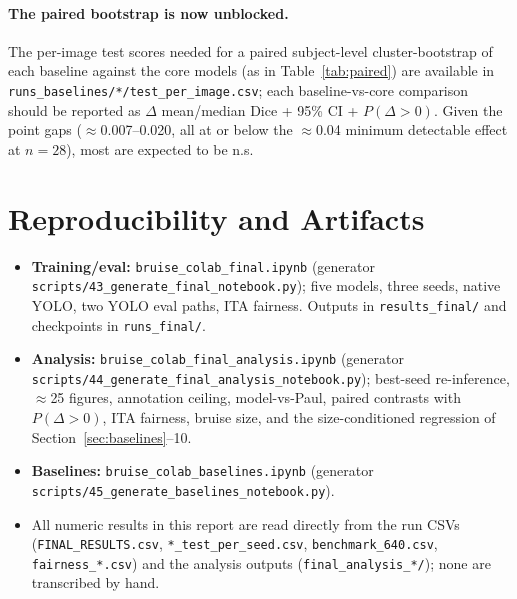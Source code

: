 \documentclass[11pt]{article}
\begin{document}
\paragraph{The paired bootstrap is now unblocked.} The per-image test scores needed for a
paired subject-level cluster-bootstrap of each baseline against the core models
(as in Table~\ref{tab:paired}) are available in
\texttt{runs\_baselines/*/test\_per\_image.csv}; each baseline-vs-core comparison should be
reported as $\Delta$ mean/median Dice + 95\% CI + $P(\Delta{>}0)$. Given the point gaps
($\approx$0.007--0.020, all at or below the $\approx$0.04 minimum detectable effect at
$n=28$), most are expected to be n.s.

\section{Reproducibility and Artifacts}
\begin{itemize}[leftmargin=1.4em]
\item \textbf{Training/eval:} \texttt{bruise\_colab\_final.ipynb}
      (generator \texttt{scripts/43\_generate\_final\_notebook.py}); five models,
      three seeds, native YOLO, two YOLO eval paths, ITA fairness. Outputs in
      \texttt{results\_final/} and checkpoints in \texttt{runs\_final/}.
\item \textbf{Analysis:} \texttt{bruise\_colab\_final\_analysis.ipynb}
      (generator \texttt{scripts/44\_generate\_final\_analysis\_notebook.py});
      best-seed re-inference, $\approx$25 figures, annotation ceiling,
      model-vs-Paul, paired contrasts with $P(\Delta{>}0)$, ITA fairness, bruise
      size, and the size-conditioned regression of
      Section~\ref{sec:baselines}--10.
\item \textbf{Baselines:} \texttt{bruise\_colab\_baselines.ipynb}
      (generator \texttt{scripts/45\_generate\_baselines\_notebook.py}).
\item All numeric results in this report are read directly from the run CSVs
      (\texttt{FINAL\_RESULTS.csv}, \texttt{*\_test\_per\_seed.csv},
      \texttt{benchmark\_640.csv}, \texttt{fairness\_*.csv}) and the analysis
      outputs (\texttt{final\_analysis\_*/}); none are transcribed by hand.
\end{itemize}

\end{document}
